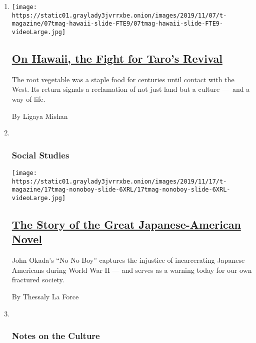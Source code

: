 \begin{enumerate}
\def\labelenumi{\arabic{enumi}.}
\item
  \texttt{[image: https://static01.graylady3jvrrxbe.onion/images/2019/11/07/t-magazine/07tmag-hawaii-slide-FTE9/07tmag-hawaii-slide-FTE9-videoLarge.jpg]}

  \hypertarget{on-hawaii-the-fight-for-taros-revival}{%
  \subsection{\texorpdfstring{\href{/2019/11/08/t-magazine/hawaii-taro.html}{On
  Hawaii, the Fight for Taro's
  Revival}}{On Hawaii, the Fight for Taro's Revival}}\label{on-hawaii-the-fight-for-taros-revival}}

  The root vegetable was a staple food for centuries until contact with
  the West. Its return signals a reclamation of not just land but a
  culture ---~and a way of life.

  By Ligaya Mishan
\item ~
  \hypertarget{social-studies}{%
  \subsubsection{Social Studies}\label{social-studies}}

  \texttt{[image: https://static01.graylady3jvrrxbe.onion/images/2019/11/17/t-magazine/17tmag-nonoboy-slide-6XRL/17tmag-nonoboy-slide-6XRL-videoLarge.jpg]}

  \hypertarget{the-story-of-the-great-japanese-american-novel}{%
  \subsection{\texorpdfstring{\href{/2019/11/04/t-magazine/japanese-american-novel.html}{The
  Story of the Great Japanese-American
  Novel}}{The Story of the Great Japanese-American Novel}}\label{the-story-of-the-great-japanese-american-novel}}

  John Okada's ``No-No Boy'' captures the injustice of incarcerating
  Japanese-Americans during World War II --- and serves as a warning
  today for our own fractured society.

  By Thessaly La Force
\item ~
  \hypertarget{notes-on-the-culture}{%
  \subsubsection{Notes on the Culture}\label{notes-on-the-culture}}


\end{enumerate}
